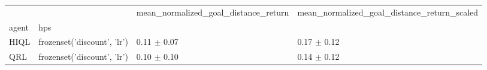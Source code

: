 \begin{tabular}{llll}
\toprule
 &  & mean_normalized_goal_distance_return & mean_normalized_goal_distance_return_scaled \\
agent & hps &  &  \\
\midrule
HIQL & frozenset({'discount', 'lr'}) & 0.11 $\pm$ 0.07 & 0.17 $\pm$ 0.12 \\
\cline{1-4}
QRL & frozenset({'discount', 'lr'}) & 0.10 $\pm$ 0.10 & 0.14 $\pm$ 0.12 \\
\cline{1-4}
\bottomrule
\end{tabular}

